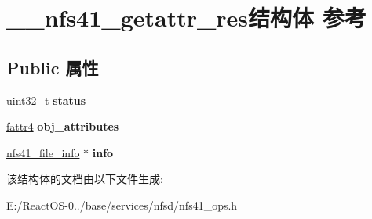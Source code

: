 \hypertarget{struct____nfs41__getattr__res}{}\section{\+\_\+\+\_\+nfs41\+\_\+getattr\+\_\+res结构体 参考}
\label{struct____nfs41__getattr__res}
\subsection*{Public 属性}
\begin{DoxyCompactItemize}
\item 
\mbox{\label{struct____nfs41__getattr__res_ac3df25bc41fbaa16319399a9c7fd1319}} 
uint32\+\_\+t {\bfseries status}
\item 
\mbox{\label{struct____nfs41__getattr__res_a2778e334762b46fd6a15e0542a59ac78}} 
\hyperlink{struct____fattr4}{fattr4} {\bfseries obj\+\_\+attributes}
\item 
\mbox{\label{struct____nfs41__getattr__res_a905f2f46be3444b065b2f0c50b731366}} 
\hyperlink{struct____nfs41__file__info}{nfs41\+\_\+file\+\_\+info} $\ast$ {\bfseries info}
\end{DoxyCompactItemize}


该结构体的文档由以下文件生成\+:\begin{DoxyCompactItemize}
\item 
E\+:/\+React\+O\+S-\/0../base/services/nfsd/nfs41\+\_\+ops.\+h\end{DoxyCompactItemize}
